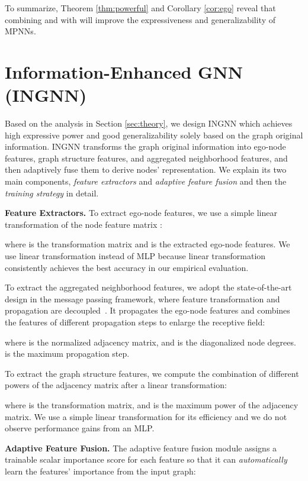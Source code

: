\documentclass{article}
\theoremstyle{plain}
\newcommand{\pjn}{{INGNN}}
\begin{document}
To summarize, Theorem \ref{thm:powerful} and Corollary \ref{cor:ego} reveal that combining  and  with  will improve the expressiveness and generalizability of MPNNs.

\section{Information-Enhanced GNN (INGNN)} \label{sec:ModelDesign}
Based on the analysis in Section \ref{sec:theory}, we design \pjn{} which achieves high expressive power and good generalizability solely based on the graph original information. \pjn{} transforms the graph original information into ego-node features, graph structure features, and aggregated neighborhood features, and then adaptively fuse them to derive nodes' representation.  We explain its two main components, \textit{feature extractors} and \textit{adaptive feature fusion} and then the \textit{training strategy} in detail. 






\textbf{Feature Extractors.} 
To extract ego-node features, we use a simple linear transformation of the node feature matrix :

where  is the transformation matrix and  is the extracted ego-node features. We use linear transformation instead of MLP because linear transformation consistently achieves the best accuracy in our empirical evaluation. 



To extract the aggregated neighborhood features, we adopt the state-of-the-art design in the message passing framework, where feature transformation and propagation are decoupled~\cite{zeng2021decoupling}. 
It propagates the ego-node features  and combines the features of different propagation steps to enlarge the receptive field: 

where  is the normalized adjacency matrix, and  is the diagonalized node degrees.  is the maximum propagation step. 



To extract the graph structure features, we compute the combination of different powers of the adjacency matrix after a linear transformation: 

where  is the transformation matrix, and  is the maximum power of the adjacency matrix. 
We use a simple linear transformation for its efficiency and we do not observe performance gains from an MLP.  

\textbf{Adaptive Feature Fusion.}
The adaptive feature fusion module assigns a trainable scalar importance score for each feature so that it can \textit{automatically} learn the features' importance from the input graph: 
\end{document}

